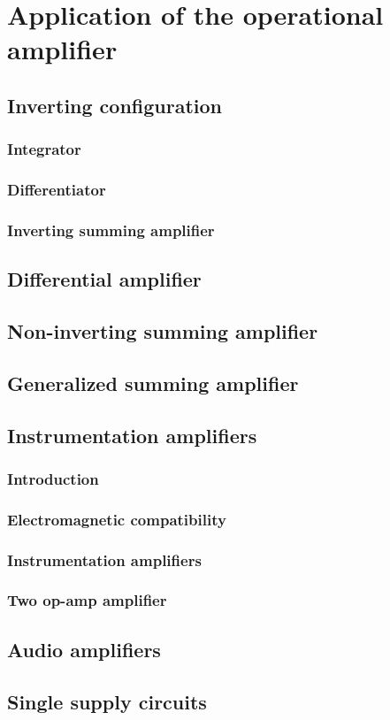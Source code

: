 \documentclass[../main.tex]{subfiles}
\begin{document}
\clearpage
\thispagestyle{empty}
\vspace*{7cm}
\section{Application of the operational amplifier}
\vspace*{1.5cm}

\subsection{Inverting configuration}
\subsubsection{Integrator}
\subsubsection{Differentiator}
\subsubsection{Inverting summing amplifier}

\subsection{Differential amplifier}
\subsection{Non-inverting summing amplifier}
\subsection{Generalized summing amplifier}

\subsection{Instrumentation amplifiers}
\subsubsection{Introduction}
\subsubsection{Electromagnetic compatibility}
\subsubsection{Instrumentation amplifiers}
\subsubsection{Two op-amp amplifier}

\subsection{Audio amplifiers}
\subsection{Single supply circuits}
\end{document}
